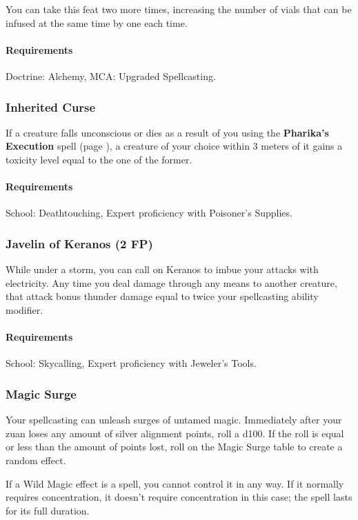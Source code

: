     You can take this feat two more times, increasing the number of vials that can be infused at the same time by one each time.
    \paragraph{Requirements} Doctrine: Alchemy, MCA: Upgraded Spellcasting.
\subsubsection{Inherited Curse} \label{feat::inheritedcurse}
    If a creature falls unconscious or dies as a result of you using the \textbf{Pharika's Execution} spell (page \pageref{spell::pharikasexecution}), a creature of your choice within 3 meters of it gains a toxicity level equal to the one of the former.
    \paragraph{Requirements} School: Deathtouching, Expert proficiency with Poisoner's Supplies.
\subsubsection{Javelin of Keranos (2 FP)} \label{feat::javelinofkeranos}
    While under a storm, you can call on Keranos to imbue your attacks with electricity.
    Any time you deal damage through any means to another creature, that attack bonus thunder damage equal to twice your spellcasting ability modifier.
    \paragraph{Requirements} School: Skycalling, Expert proficiency with Jeweler's Tools.
\subsubsection{Magic Surge} \label{feat::magicsurge}
    Your spellcasting can unleash surges of untamed magic.
    Immediately after your zuan loses any amount of silver alignment points, roll a d100.
    If the roll is equal or less than the amount of points lost, roll on the Magic Surge table to create a random effect.

    If a Wild Magic effect is a spell, you cannot control it in any way.
    If it normally requires concentration, it doesn't require concentration in this case; the spell lasts for its full duration.

